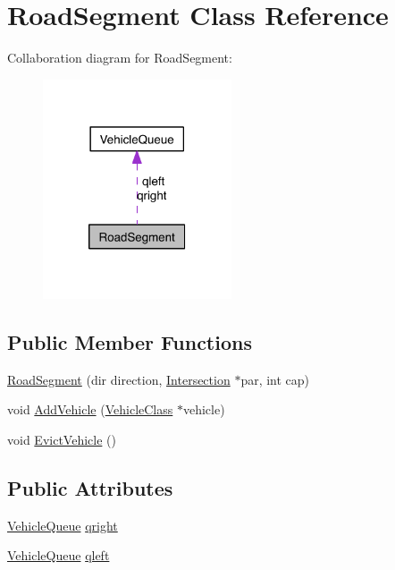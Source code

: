 \hypertarget{class_road_segment}{\section{Road\-Segment Class Reference}
\label{class_road_segment}
}


Collaboration diagram for Road\-Segment\-:\nopagebreak
\begin{figure}[H]
\begin{center}
\leavevmode
\includegraphics[width=158pt]{class_road_segment__coll__graph}
\end{center}
\end{figure}
\subsection*{Public Member Functions}
\begin{DoxyCompactItemize}
\item 
\hyperlink{class_road_segment_ab7caf1e5f213f7584687edce88a17cdd}{Road\-Segment} (dir direction, \hyperlink{class_intersection}{Intersection} $\ast$par, int cap)
\item 
void \hyperlink{class_road_segment_a86d7460856feadb6faa86e130b090479}{Add\-Vehicle} (\hyperlink{class_vehicle_class}{Vehicle\-Class} $\ast$vehicle)
\item 
void \hyperlink{class_road_segment_a9ca3951ccd16a925d6aad11ff97f6591}{Evict\-Vehicle} ()
\end{DoxyCompactItemize}
\subsection*{Public Attributes}
\begin{DoxyCompactItemize}
\item 
\hyperlink{class_vehicle_queue}{Vehicle\-Queue} \hyperlink{class_road_segment_a33e663e38e3d1944398ff70198fdb77b}{qright}
\item 
\hyperlink{class_vehicle_queue}{Vehicle\-Queue} \hyperlink{class_road_segment_a0272daa14fc04bc471f81409db27b80b}{qleft}
\end{DoxyCompactItemize}


